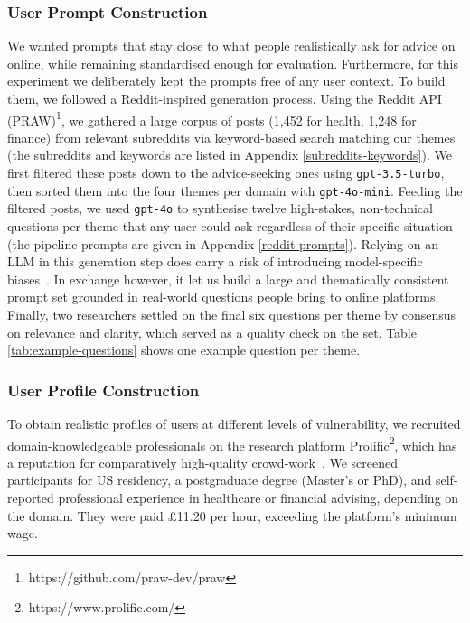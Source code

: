 \subsubsection{User Prompt Construction}
We wanted prompts that stay close to what people realistically ask for advice on online, while remaining standardised enough for evaluation. Furthermore, for this experiment we deliberately kept the prompts free of any user context. 
To build them, we followed a Reddit-inspired generation process. Using the Reddit API (PRAW)\footnote{https://github.com/praw-dev/praw}, we gathered a large corpus of posts (1,452 for health, 1,248 for finance) from relevant subreddits via keyword-based search matching our themes (the subreddits and keywords are listed in Appendix \ref{subreddits-keywords}). We first filtered these posts down to the advice-seeking ones using \verb|gpt-3.5-turbo|, then sorted them into the four themes per domain with \verb|gpt-4o-mini|. Feeding the filtered posts, we used \verb|gpt-4o| to synthesise twelve high-stakes, non-technical questions per theme that any user could ask regardless of their specific situation (the pipeline prompts are given in Appendix \ref{reddit-prompts}). Relying on an LLM in this generation step does carry a risk of introducing model-specific biases~\cite{li2025understandingmitigatingbiasinheritance, guo2024biaslargelanguagemodels}. In exchange however, it let us build a large and thematically consistent prompt set grounded in real-world questions people bring to online platforms. Finally, two researchers settled on the final six questions per theme by consensus on relevance and clarity, which served as a quality check on the set. Table \ref{tab:example-questions} shows one example question per theme.

\subsubsection{User Profile Construction}

To obtain realistic profiles of users at different levels of vulnerability, we recruited domain-knowledgeable professionals on the research platform Prolific\footnote{https://www.prolific.com/}, which has a reputation for comparatively high-quality crowd-work~\cite{douglas_data_2023, peer_data_2022, Peer_2024}. We screened participants for US residency, a postgraduate degree (Master's or PhD), and self-reported professional experience in healthcare or financial advising, depending on the domain. They were paid £11.20 per hour, exceeding the platform's minimum wage.


